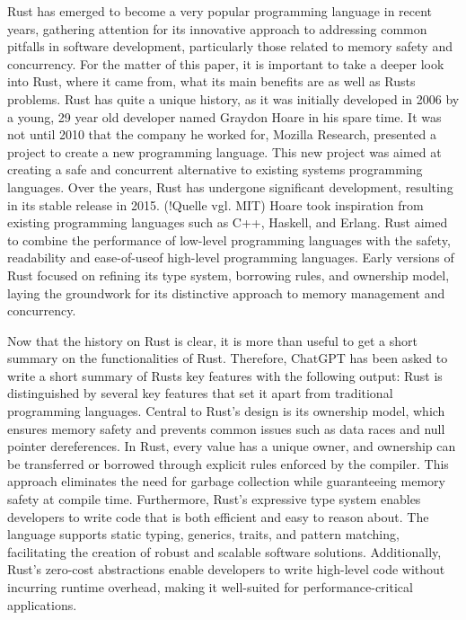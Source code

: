 Rust has emerged to become a very popular programming language in recent years, gathering attention for its innovative approach to addressing common pitfalls in software development, particularly those related to memory safety and concurrency. For the matter of this paper, it is important to take a deeper look into Rust, where it came from, what its main benefits are as well as Rusts problems. 
Rust has quite a unique history, as it was initially developed in 2006 by a young, 29 year old developer named Graydon Hoare in his spare time. It was not until 2010 that the company he worked for, Mozilla Research, presented a project to create a new programming language. This new project was aimed at creating a safe and concurrent alternative to existing systems programming languages. Over the years, Rust has undergone significant development, resulting in its stable release in 2015. (!Quelle vgl. MIT) Hoare took inspiration from existing programming languages such as C++, Haskell, and Erlang. Rust aimed to combine the performance of low-level programming languages with the safety, readability and \dq ease-of-use\dq of high-level programming languages. Early versions of Rust focused on refining its type system, borrowing rules, and ownership model, laying the groundwork for its distinctive approach to memory management and concurrency.

Now that the history on Rust is clear, it is more than useful to get a short summary on the functionalities of Rust. Therefore, ChatGPT has been asked to write a short summary of Rusts key features with the following output:
Rust is distinguished by several key features that set it apart from traditional programming languages. Central to Rust's design is its ownership model, which ensures memory safety and prevents common issues such as data races and null pointer dereferences. In Rust, every value has a unique owner, and ownership can be transferred or borrowed through explicit rules enforced by the compiler. This approach eliminates the need for garbage collection while guaranteeing memory safety at compile time. Furthermore, Rust's expressive type system enables developers to write code that is both efficient and easy to reason about. The language supports static typing, generics, traits, and pattern matching, facilitating the creation of robust and scalable software solutions. Additionally, Rust's zero-cost abstractions enable developers to write high-level code without incurring runtime overhead, making it well-suited for performance-critical applications.

